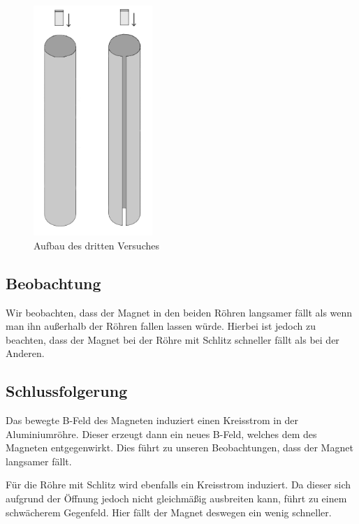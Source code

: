 \documentclass[11pt,a4paper,titlepage, ngerman]{article}
\begin{document}
		\begin{figure}
			\centering
			\includegraphics[width=0.4\textwidth]{Neodymmagnet.png}
			\caption{Aufbau des dritten Versuches} %
			\label{fig:Neodymmagnet}
		\end{figure}
		
		\subsection*{Beobachtung}
			
			Wir beobachten, dass der Magnet in den beiden Röhren langsamer fällt als wenn man ihn außerhalb der Röhren fallen lassen würde.
			Hierbei ist jedoch zu beachten, dass der Magnet bei der Röhre mit Schlitz schneller fällt als bei der Anderen.
			
		\subsection*{Schlussfolgerung}	
		
			Das bewegte B-Feld des Magneten induziert einen Kreisstrom in der Aluminiumröhre. Dieser erzeugt dann ein neues B-Feld, welches dem des Magneten entgegenwirkt. Dies führt zu unseren Beobachtungen, dass der Magnet langsamer fällt. %
			
			Für die Röhre mit Schlitz wird ebenfalls ein Kreisstrom induziert. Da dieser sich aufgrund der Öffnung jedoch nicht gleichmäßig ausbreiten kann, führt zu einem schwächerem Gegenfeld. Hier fällt der Magnet deswegen ein wenig schneller.		
					
\end{document}

